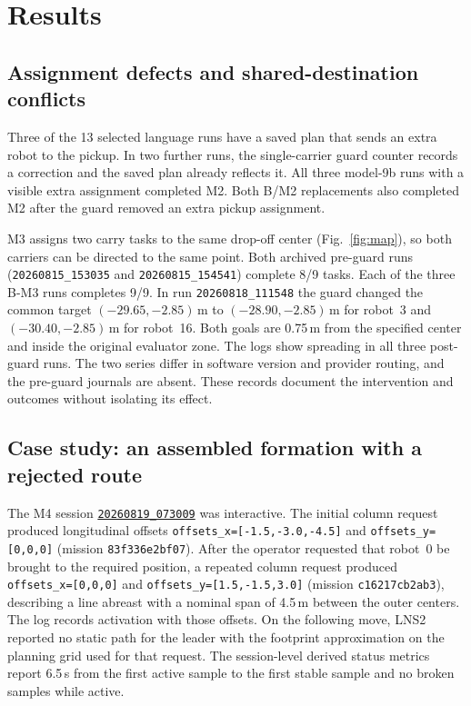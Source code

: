 \documentclass[pdflatex,sn-mathphys-num]{sn-jnl}
\newcommand{\code}[1]{{\def\{{\textnormal{\textbraceleft}}\def\}{\textnormal{\textbraceright}}\texttt{#1}}}
\begin{document}
\section{Results}
\label{sec:results}

\subsection{Assignment defects and shared-destination conflicts}
\label{sec:absorb}

Three of the 13 selected language runs have a saved plan that sends an
extra robot to the pickup. In two further runs, the single-carrier guard
counter records a correction and the saved plan already reflects it.
All three model-9b runs with a visible extra assignment completed M2.
Both B/M2 replacements also completed M2 after the guard removed an
extra pickup assignment.

M3 assigns two carry tasks to the same drop-off center
(Fig.~\ref{fig:map}), so both carriers can be directed to the same point.
Both archived pre-guard runs (\code{20260815\_153035} and
\code{20260815\_154541}) complete 8/9 tasks. Each of the three B-M3 runs
completes 9/9. In run \code{20260818\_111548} the guard changed the common
target $(-29.65,-2.85)$\,m to $(-28.90,-2.85)$\,m for robot~3 and
$(-30.40,-2.85)$\,m for robot~16. Both goals are 0.75\,m from the specified
center and inside the original evaluator zone. The logs show spreading
in all three post-guard runs. The two series differ in software version
and provider routing, and the pre-guard journals are absent. These records
document the intervention and outcomes without isolating its effect.

\subsection{Case study: an assembled formation with a rejected route}
The M4 session
\href{https://github.com/Innopolis-Robotics-Society/llm_swarm}{\code{20260819\_073009}}
was interactive. The initial column request produced longitudinal offsets
\code{offsets\_x=[-1.5,-3.0,-4.5]} and \code{offsets\_y=[0,0,0]}
(mission \code{83f336e2bf07}). After the operator requested that robot~0 be
brought to the required position, a repeated column request produced
\code{offsets\_x=[0,0,0]} and \code{offsets\_y=[1.5,-1.5,3.0]}
(mission \code{c16217cb2ab3}), describing a line abreast with a nominal span
of 4.5\,m between the outer centers. The log records activation with those
offsets. On the following move, LNS2 reported no static path for the leader
with the footprint approximation on the planning grid used for that request.
The session-level derived status metrics report 6.5\,s from the first active
sample to the first stable sample and no broken samples while active.
\end{document}
